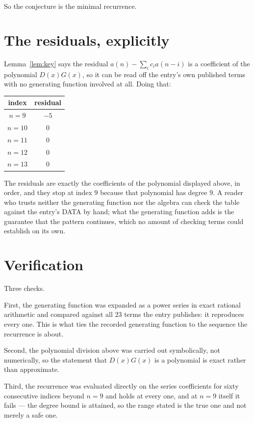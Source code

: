 \documentclass[11pt,a4paper]{article}
\theoremstyle{plain}
\theoremstyle{definition}
\begin{document}
So the conjecture is the minimal recurrence.

\section{The residuals, explicitly}

Lemma~\ref{lem:key} says the residual $a(n)-\sum_ic_ia(n-i)$ is a coefficient of the
polynomial $D(x)G(x)$, so it can be read off the entry's own published terms with no
generating function involved at all. Doing that:
\begin{center}
\begin{tabular}{cc}
index & residual \\ \hline
$n=9$ & $-5$ \\
$n=10$ & $0$ \\
$n=11$ & $0$ \\
$n=12$ & $0$ \\
$n=13$ & $0$
\end{tabular}
\end{center}
The residuals are exactly the coefficients of the polynomial displayed above, in order, and
they stop at index $9$ because that polynomial has degree $9$. A reader who trusts
neither the generating function nor the algebra can check the table against the entry's DATA
by hand; what the generating function adds is the guarantee that the pattern continues, which
no amount of checking terms could establish on its own.

\section{Verification}

Three checks.

First, the generating function was expanded as a power series in exact rational arithmetic and
compared against all $23$ terms the entry publishes: it reproduces every one. This is
what ties the recorded generating function to the sequence the recurrence is about.

Second, the polynomial division above was carried out symbolically, not numerically, so the
statement that $D(x)G(x)$ is a polynomial is exact rather than approximate.

Third, the recurrence was evaluated directly on the series coefficients for sixty consecutive
indices beyond $n=9$ and holds at every one, and at $n=9$ itself it fails --- the
degree bound is attained, so the range stated is the true one and not merely a safe one.
\end{document}
